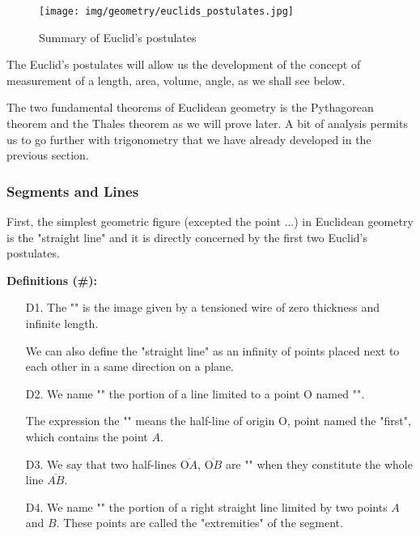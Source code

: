	\begin{figure}[H]
		\centering
		\texttt{[image: img/geometry/euclids\_postulates.jpg]}
		\caption{Summary of Euclid's postulates}
	\end{figure}
	The Euclid's postulates will allow us the development of the concept of measurement of a length, area, volume, angle, as we shall see below.
	
	The two fundamental theorems of Euclidean geometry is the Pythagorean theorem and the Thales theorem as we will prove later. A bit of analysis permits us to go further with trigonometry that we have already developed in the previous section.
	
	\subsubsection{Segments and Lines}
	First, the simplest geometric figure (excepted the point ...) in Euclidean geometry is the "straight line" and it is directly concerned by the first two Euclid's postulates.
	
	\textbf{Definitions (\#\mydef):}
	\begin{enumerate}
		\item[D1.] The "" is the image given by a tensioned wire of zero thickness and infinite length.
		\begin{tcolorbox}[title=Remark,colframe=black,arc=10pt]
		We can also define the "straight line" as an infinity of points placed next to each other in a same direction on a plane.
		\end{tcolorbox}
		
		\item[D2.] We name "" the portion of a line limited to a point O named "".
		\begin{tcolorbox}[title=Remark,colframe=black,arc=10pt]
		The expression the "" means the half-line of origin O, point named the "first", which contains the point $A$.
		\end{tcolorbox}
		
		\item[D3.] We say that two half-lines $\overline{\text{O}A}$, $\overline{\text{O}B}$ are "" when they constitute the whole line $\overline{AB}$.
		
		\item[D4.] We name "" the portion of a right straight line limited by two points $A$ and $B$. These points are called the "extremities" of the segment.
	\end{enumerate}
	
